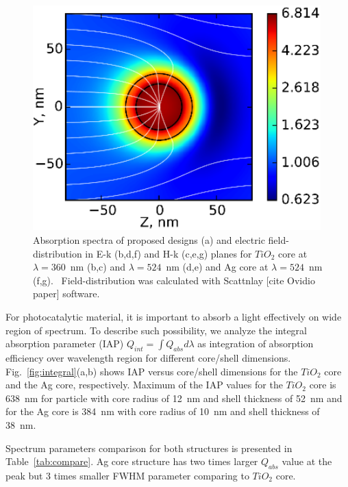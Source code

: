 \documentclass[aip,jap,reprint]{revtex4-1}
\begin{document}
\begin{figure}[!h]
\begin{minipage}[h]{0.235\textwidth}
  \end{minipage}
  \hfill
  \begin{minipage}[h]{0.235\textwidth}
    \includegraphics[width=0.99\textwidth]{3g}
  \end{minipage}%
  \caption{Absorption spectra of proposed
designs (a) and electric field-distribution in E-k (b,d,f) and H-k (c,e,g)
planes for $TiO_2$ core at  $\lambda=360$~nm
(b,c) and $\lambda=524$~nm (d,e) and Ag
core at  $\lambda=524$~nm (f,g).~
Field-distribution was calculated with Scattnlay [cite Ovidio paper]
software. \label{fig:field}}%
\end{figure}

For photocatalytic material, it is important to absorb a light
effectively on wide region of spectrum. To describe such possibility,
we analyze the integral absorption parameter (IAP)
$Q_{int} = \int Q_{abs}d\lambda$
as integration of absorption efficiency over wavelength region for
different core/shell dimensions. Fig.~\ref{fig:integral}(a,b) shows IAP versus
core/shell dimensions for the $TiO_2$
core and the Ag core, respectively.  Maximum of the IAP values for the
$TiO_2$
core is 638~nm for particle with core radius of 12~nm and shell
thickness of 52~nm and for the Ag core is 384~nm with core radius of
10~nm and shell thickness of 38~nm.

Spectrum parameters comparison for both structures is presented in
Table~\ref{tab:compare}. Ag core structure has two times larger
$Q_{abs}$
value at the peak but 3 times smaller FWHM parameter comparing to
$TiO_2$ core.
\end{document}
